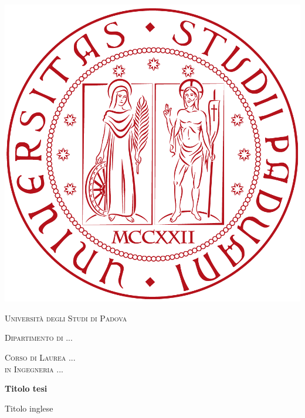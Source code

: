 \begin{titlepage}

    \begin{center}
        \includegraphics[scale=0.1]{images/titlepage/logo_unipd_small}
        
        \vspace{1cm}
        
        \textsc{\LARGE Universit\`{a} degli Studi di Padova}
        
        \vspace{0.5cm}
        
        \textsc{\large Dipartimento di ...}
        
        \vspace{0.5cm}
        
        \textsc{\large Corso di Laurea ...\\in Ingegneria ...}
        
        \vfill
        
        {\Huge \bfseries Titolo tesi}
        
        \vspace{1cm}
        
        {\LARGE Titolo inglese}
    \end{center}
    
    \vfill
    

\end{titlepage}
